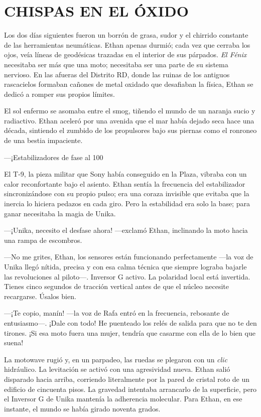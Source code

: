 \documentclass[11pt,twoside]{book}
\begin{document}
\chapter{CHISPAS EN EL ÓXIDO}

Los dos días siguientes fueron un borrón de grasa, sudor y el chirrido constante de las herramientas neumáticas. Ethan apenas durmió; cada vez que cerraba los ojos, veía líneas de geodésicas trazadas en el interior de sus párpados. \textit{El Fénix} necesitaba ser más que una moto; necesitaba ser una parte de su sistema nervioso. En las afueras del Distrito RD, donde las ruinas de los antiguos rascacielos formaban cañones de metal oxidado que desafiaban la física, Ethan se dedicó a romper sus propios límites.

El sol enfermo se asomaba entre el smog, tiñendo el mundo de un naranja sucio y radiactivo. Ethan aceleró por una avenida que el mar había dejado seca hace una década, sintiendo el zumbido de los propulsores bajo sus piernas como el ronroneo de una bestia impaciente.

---¡Estabilizadores de fase al 100%

El T-9, la pieza militar que Sony había conseguido en la Plaza, vibraba con un calor reconfortante bajo el asiento. Ethan sentía la frecuencia del estabilizador sincronizándose con su propio pulso; era una coraza invisible que evitaba que la inercia lo hiciera pedazos en cada giro. Pero la estabilidad era solo la base; para ganar necesitaba la magia de Unika.

---¡Unika, necesito el desfase ahora! ---exclamó Ethan, inclinando la moto hacia una rampa de escombros.

---No me grites, Ethan, los sensores están funcionando perfectamente ---la voz de Unika llegó nítida, precisa y con esa calma técnica que siempre lograba bajarle las revoluciones al piloto---. Inversor G activo. La polaridad local está invertida. Tienes cinco segundos de tracción vertical antes de que el núcleo necesite recargarse. Úsalos bien.

---¡Te copio, manín! ---la voz de Rafa entró en la frecuencia, rebosante de entusiasmo---. ¡Dale con todo! He puenteado los relés de salida para que no te den tirones. ¡Si esa moto fuera una mujer, tendría que casarme con ella de lo bien que suena!

La motowave rugió y, en un parpadeo, las ruedas se plegaron con un \textit{clic} hidráulico. La levitación se activó con una agresividad nueva. Ethan salió disparado hacia arriba, corriendo literalmente por la pared de cristal roto de un edificio de cincuenta pisos. La gravedad intentaba arrancarlo de la superficie, pero el Inversor G de Unika mantenía la adherencia molecular. Para Ethan, en ese instante, el mundo se había girado noventa grados.
\end{document}
